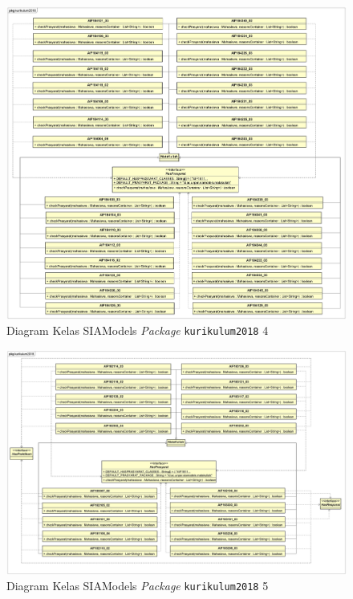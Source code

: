 \documentclass[a4paper,twoside]{article}
\begin{document}
\begin{enumerate}
		\begin{figure}[H]
		\centering
		\includegraphics[scale=0.105]{Gambar/class-diagram-siamodels-mk-kurikulum-2018-4}
		\caption{Diagram Kelas SIAModels \textit{Package} \texttt{kurikulum2018} 4}
		\label{fig:siamodels_class_2018_kurikulum_4}
		\end{figure}

		\begin{figure}[H]
		\centering
		\includegraphics[scale=0.105]{Gambar/class-diagram-siamodels-mk-kurikulum-2018-5}
		\caption{Diagram Kelas SIAModels \textit{Package} \texttt{kurikulum2018} 5}
		\label{fig:siamodels_class_2018_kurikulum_5}
		\end{figure}
		
	\end{enumerate}
\end{document}
